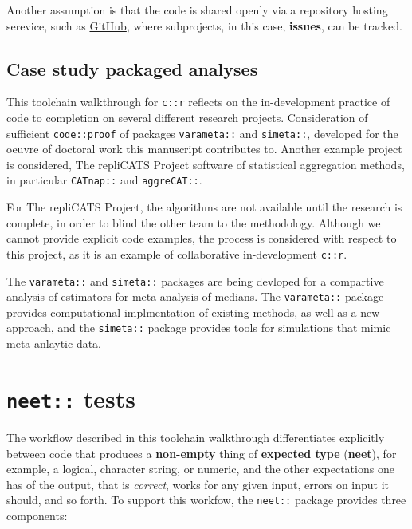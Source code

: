 \documentclass[
]{article}
\begin{document}
Another assumption is that the code is shared openly via a repository hosting serevice, such as \href{https://github.com/}{GitHub}, where subprojects, in this case, \textbf{issues}, can be tracked.

\hypertarget{case-study-packaged-analyses}{%
\subsection{Case study packaged analyses}\label{case-study-packaged-analyses}}

This toolchain walkthrough for \texttt{c::r} reflects on the in-development practice of code to completion on several different research projects. Consideration of sufficient \texttt{code::proof} of packages \texttt{varameta::} and \texttt{simeta::}, developed for the oeuvre of doctoral work this manuscript contributes to. Another example project is considered, The repliCATS Project software of statistical aggregation methods, in particular \texttt{CATnap::} and \texttt{aggreCAT::}.

For The repliCATS Project, the algorithms are not available until the research is complete, in order to blind the other team to the methodology. Although we cannot provide explicit code examples, the process is considered with respect to this project, as it is an example of collaborative in-development \texttt{c::r}.

The \texttt{varameta::} and \texttt{simeta::} packages are being devloped for a compartive analysis of estimators for meta-analysis of medians. The \texttt{varameta::} package provides computational implmentation of existing methods, as well as a new approach, and the \texttt{simeta::} package provides tools for simulations that mimic meta-anlaytic data.

\hypertarget{neet-tests}{%
\section{\texorpdfstring{\texttt{neet::} tests}{neet:: tests}}\label{neet-tests}}

The workflow described in this toolchain walkthrough differentiates explicitly between code that produces a \textbf{non-empty} thing of \textbf{expected type} (\textbf{neet}), for example, a logical, character string, or numeric, and the other expectations one has of the output, that is \emph{correct}, works for any given input, errors on input it should, and so forth. To support this workfow, the \texttt{neet::} package provides three components:
\end{document}
